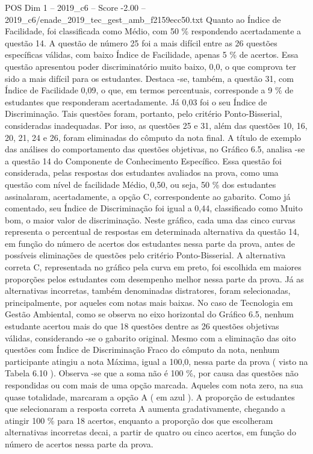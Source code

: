 \begin{textsample}{POS Dim 1 – 2019\_c6 – Score -2.00 – 2019\_c6/enade\_2019\_tec\_gest\_amb\_f2159ecc50.txt}
Quanto ao Índice de Facilidade, foi classificada como Médio, com 50 \% respondendo acertadamente a questão 14.
A questão de número 25 foi a mais difícil entre as 26 questões específicas válidas, com baixo Índice de Facilidade, apenas 5 \% de acertos.
Essa questão apresentou poder discriminatório muito baixo, 0,0, o que comprova ter sido a mais difícil para os estudantes.
Destaca -se, também, a questão 31, com Índice de Facilidade 0,09, o que, em termos percentuais, corresponde a 9 \% de estudantes que responderam acertadamente.
Já 0,03 foi o seu Índice de Discriminação.
Tais questões foram, portanto, pelo critério Ponto-Bisserial, consideradas inadequadas.
Por isso, as questões 25 e 31, além das questões 10, 16, 20, 21, 24 e 26, foram eliminadas do cômputo da nota final.
A título de exemplo das análises do comportamento das questões objetivas, no Gráfico 6.5, analisa -se a questão 14 do Componente de Conhecimento Específico.
Essa questão foi considerada, pelas respostas dos estudantes avaliados na prova, como uma questão com nível de facilidade Médio, 0,50, ou seja, 50 \% dos estudantes assinalaram, acertadamente, a opção C, correspondente ao gabarito.
Como já comentado, seu Índice de Discriminação foi igual a 0,44, classificado como Muito bom, o maior valor de discriminação.
Neste gráfico, cada uma das cinco curvas representa o percentual de respostas em determinada alternativa da questão 14, em função do número de acertos dos estudantes nessa parte da prova, antes de possíveis eliminações de questões pelo critério Ponto-Bisserial.
A alternativa correta C, representada no gráfico pela curva em preto, foi escolhida em maiores proporções pelos estudantes com desempenho melhor nessa parte da prova.
Já as alternativas incorretas, também denominadas distratores, foram selecionadas, principalmente, por aqueles com notas mais baixas.
No caso de Tecnologia em Gestão Ambiental, como se observa no eixo horizontal do Gráfico 6.5, nenhum estudante acertou mais do que 18 questões dentre as 26 questões objetivas válidas, considerando -se o gabarito original.
Mesmo com a eliminação das oito questões com Índice de Discriminação Fraco do cômputo da nota, nenhum participante atingiu a nota Máxima, igual a 100,0, nessa parte da prova ( visto na Tabela 6.10 ).
Observa -se que a soma não é 100 \%, por causa das questões não respondidas ou com mais de uma opção marcada.
Aqueles com nota zero, na sua quase totalidade, marcaram a opção A ( em azul ).
A proporção de estudantes que selecionaram a resposta correta A aumenta gradativamente, chegando a atingir 100 \% para 18 acertos, enquanto a proporção dos que escolheram alternativas incorretas decai, a partir de quatro ou cinco acertos, em função do número de acertos nessa parte da prova.

\end{textsample}
